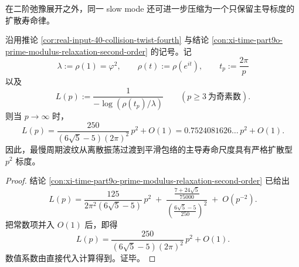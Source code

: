 在二阶弛豫展开之外，同一 slow mode 还可进一步压缩为一个只保留主导标度的扩散寿命律。

\begin{theorem}[周期波纹的扩散寿命律]\label{thm:xi-time-part9o-periodic-ripple-diffusive-lifetime}
沿用推论 \ref{cor:real-input-40-collision-twist-fourth} 与结论
\ref{con:xi-time-part9o-prime-modulus-relaxation-second-order} 的记号。记
\[
\lambda:=\rho(1)=\varphi^2,
\qquad
\rho(t):=\rho(e^{it}),
\qquad
t_p:=\frac{2\pi}{p}
\]
以及
\[
L(p):=\frac{1}{-\log(\rho(t_p)/\lambda)}
\qquad
(p\ge 3\ \text{为奇素数}).
\]
则当 \(p\to\infty\) 时，
\[
L(p)
=
\frac{250}{(6\sqrt5-5)(2\pi)^2}\,p^2+O(1)
=
0.7524081626\ldots\,p^2+O(1).
\]
因此，最慢周期波纹从离散振荡过渡到平滑包络的主导寿命尺度具有严格扩散型 \(p^2\) 标度。
\end{theorem}
\begin{proof}
结论 \ref{con:xi-time-part9o-prime-modulus-relaxation-second-order} 已给出
\[
L(p)
=
\frac{125}{2\pi^2(6\sqrt5-5)}\,p^2
\;+\;
\frac{\frac{7+24\sqrt5}{75000}}
{\left(\frac{6\sqrt5-5}{250}\right)^2}
\;+\;
O(p^{-2}).
\]
把常数项并入 \(O(1)\) 后，即得
\[
L(p)=\frac{250}{(6\sqrt5-5)(2\pi)^2}\,p^2+O(1).
\]
数值系数由直接代入计算得到。证毕。
\end{proof}

\endinput

